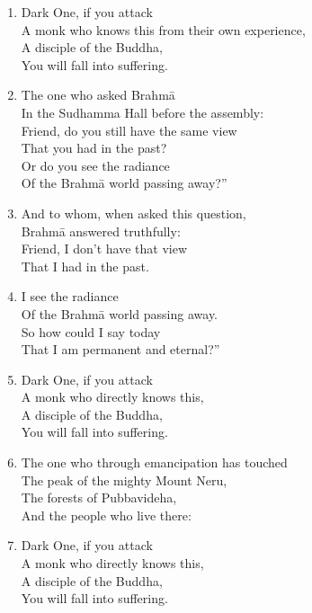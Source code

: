 \documentclass[10pt, openany]{book}
\newcommand*{\vleftofline}[1]{\leavevmode\llap{#1}}
\begin{document}
\begin{enumerate}
\item \vleftofline{‘}Dark One, if you attack\\
A monk who knows this from their own experience,\\
A disciple of the Buddha,\\
You will fall into suffering.

\item \vleftofline{‘}The one who asked Brahmā\\
In the Sudhamma Hall before the assembly:\\
\vleftofline{“}Friend, do you still have the same view\\
That you had in the past?\\
Or do you see the radiance\\
Of the Brahmā world passing away?”

\item \vleftofline{‘}And to whom, when asked this question,\\
Brahmā answered truthfully:\\
\vleftofline{“}Friend, I don’t have that view\\
That I had in the past.

\item \vleftofline{‘“}I see the radiance\\
Of the Brahmā world passing away.\\
So how could I say today\\
That I am permanent and eternal?”

\item \vleftofline{‘}Dark One, if you attack\\
A monk who directly knows this,\\
A disciple of the Buddha,\\
You will fall into suffering.

\item \vleftofline{‘}The one who through emancipation has touched\\
The peak of the mighty Mount Neru,\\
The forests of Pubbavideha,\\
And the people who live there:

\item \vleftofline{‘}Dark One, if you attack\\
A monk who directly knows this,\\
A disciple of the Buddha,\\
You will fall into suffering.


\end{enumerate}
\end{document}
